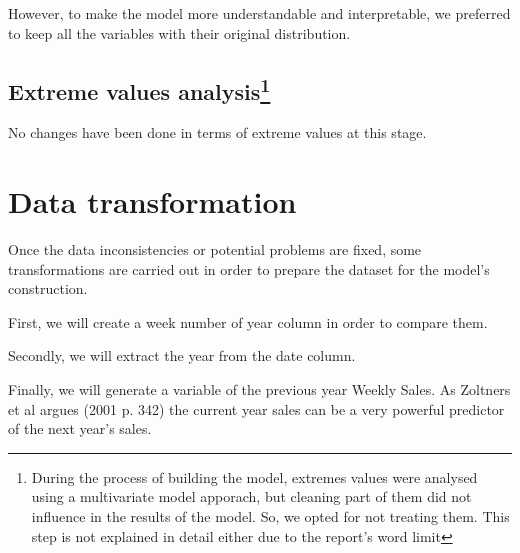\documentclass[11pt,]{article}
\newenvironment{Shaded}{\begin{snugshade}}{\end{snugshade}}
\newcommand{\KeywordTok}[1]{\textcolor[rgb]{0.13,0.29,0.53}{\textbf{{#1}}}}
\newcommand{\DecValTok}[1]{\textcolor[rgb]{0.00,0.00,0.81}{{#1}}}
\newcommand{\StringTok}[1]{\textcolor[rgb]{0.31,0.60,0.02}{{#1}}}
\newcommand{\CommentTok}[1]{\textcolor[rgb]{0.56,0.35,0.01}{\textit{{#1}}}}
\newcommand{\NormalTok}[1]{{#1}}
\let\rmarkdownfootnote\footnote%
\def\footnote{\protect\rmarkdownfootnote}
\begin{document}
However, to make the model more understandable and interpretable, we
preferred to keep all the variables with their original distribution.

\subsection[Extreme values analysis]{\texorpdfstring{Extreme values
analysis\footnote{During the process of building the model, extremes
  values were analysed using a multivariate model apporach, but cleaning
  part of them did not influence in the results of the model. So, we
  opted for not treating them. This step is not explained in detail
  either due to the report's word limit}}{Extreme values analysis}}\label{extreme-values-analysis}

No changes have been done in terms of extreme values at this stage.

\section{Data transformation}\label{data-transformation}

Once the data inconsistencies or potential problems are fixed, some
transformations are carried out in order to prepare the dataset for the
model's construction.

First, we will create a week number of year column in order to compare
them.

\begin{Shaded}
\end{Shaded}

Secondly, we will extract the year from the date column.

\begin{Shaded}
\end{Shaded}

Finally, we will generate a variable of the previous year Weekly Sales.
As Zoltners et al argues (2001 p. 342) the current year sales can be a
very powerful predictor of the next year's sales.
\end{document}
